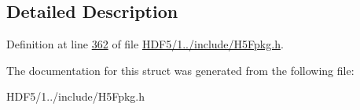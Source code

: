 \subsection{Detailed Description}


Definition at line \hyperlink{_h_d_f5_21_810_81_2include_2_h5_fpkg_8h_source_l00362}{362} of file \hyperlink{_h_d_f5_21_810_81_2include_2_h5_fpkg_8h_source}{H\+D\+F5/1../include/\+H5\+Fpkg.\+h}.



The documentation for this struct was generated from the following file\+:\begin{DoxyCompactItemize}
\item 
H\+D\+F5/1../include/\+H5\+Fpkg.\+h\end{DoxyCompactItemize}
